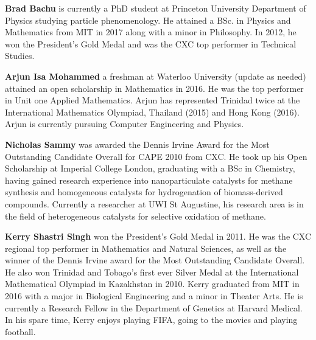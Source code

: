 \textbf{Brad Bachu} is currently a PhD student at Princeton
University Department of Physics studying particle phenomenology.
He attained a BSc. in Physics and Mathematics from MIT in 2017 along 
with a minor in Philosophy. In 2012, he won the President's Gold Medal
and was the CXC top performer in Technical Studies.

\vspace{5pt}

\noindent\textbf{Arjun Isa Mohammed} a freshman at Waterloo University
(update as needed)
attained an open scholarship in Mathematics in 2016.
He was the top performer in Unit one Applied Mathematics.
Arjun has represented Trinidad twice at the International
Mathematics Olympiad, Thailand (2015) and Hong Kong (2016).
Arjun is currently pursuing Computer Engineering and Physics.
\vspace{5pt}

\noindent\textbf{Nicholas Sammy} was awarded the Dennis Irvine Award for 
the Most Outstanding Candidate Overall for CAPE 2010 from CXC. He took up 
his Open Scholarship at Imperial College London, graduating with a BSc in
Chemistry, having gained research experience into nanoparticulate catalysts 
for methane synthesis and homogeneous catalysts for hydrogenation of
biomass-derived compounds. Currently a researcher at UWI St Augustine,
his research area is in the field of heterogeneous catalysts for selective
oxidation of methane.

\vspace{5pt}

\noindent\textbf{Kerry Shastri Singh} won the President's Gold Medal in
2011. He was the CXC regional top performer in Mathematics and Natural
Sciences, as well as the winner of the Dennis Irvine award for the Most
Outstanding Candidate Overall. He also won Trinidad and Tobago's first
ever Silver Medal at the International Mathematical Olympiad in
Kazakhstan in 2010. Kerry graduated from MIT in 2016 with a major in
Biological Engineering and a minor in Theater Arts. He is currently a
Research Fellow in the Department of Genetics at Harvard Medical. In
his spare time, Kerry enjoys playing FIFA, going to the movies
and playing football.
